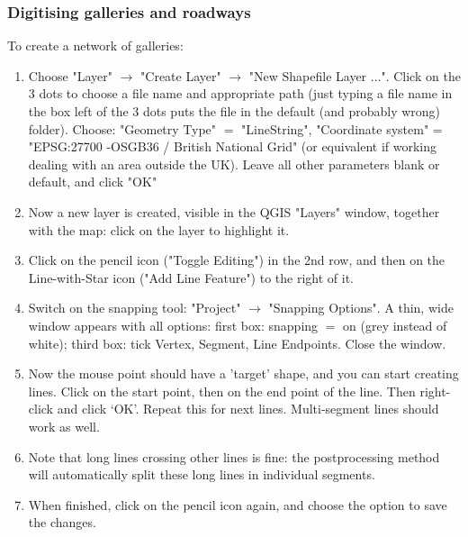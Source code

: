 \subsubsection{Digitising galleries and roadways}
\label{sec:digitising_galleries}
To create a network of galleries: 
\begin{enumerate}
    \item Choose "Layer" $\rightarrow$ "Create Layer" $\rightarrow$ "New Shapefile Layer ...". Click on the 3 dots to choose a file name and appropriate path (just typing a file name in the box left of the 3 dots puts the file in the default (and probably wrong) folder). Choose: "Geometry Type" $=$ "LineString", "Coordinate system" = "EPSG:27700 -OSGB36 / British National Grid" (or equivalent if working dealing with an area outside the UK). Leave all other parameters blank or default, and click "OK"
    \item Now a new layer is created, visible in the QGIS "Layers" window, together with the map: click on the layer to highlight it. 
    \item Click on the pencil icon ("Toggle Editing") in the 2nd row, and then on the Line-with-Star icon ("Add Line Feature") to the right of it.
    \item Switch on the snapping tool: "Project" $\rightarrow$ "Snapping Options". A thin, wide window appears with all options: first box: snapping $=$ on (grey instead of white); third box: tick Vertex, Segment, Line Endpoints. Close the window.
    \item Now the mouse point should have a 'target’ shape, and you can start creating lines. Click on the start point, then on the end point of the line. Then right-click and click ‘OK’. Repeat this for next lines. Multi-segment lines should work as well.
    \item Note that long lines crossing other lines is fine: the postprocessing method will automatically split these long lines in individual segments. 
    \item When finished, click on the pencil icon again, and choose the option to save the changes.
\end{enumerate}

